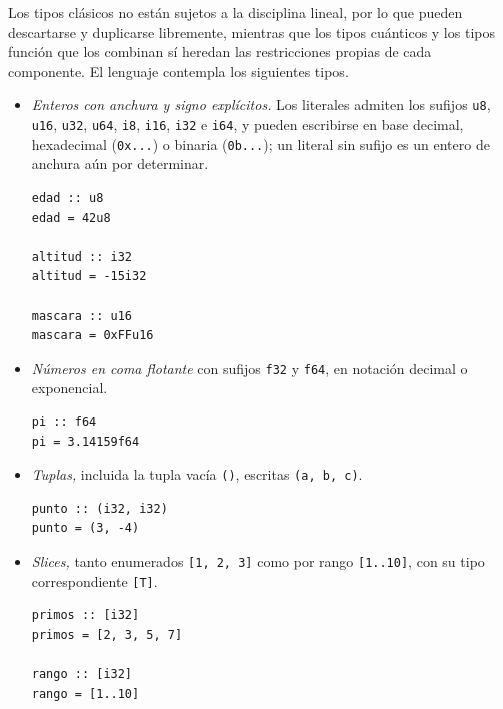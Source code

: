 Los tipos clásicos no están sujetos a la disciplina lineal, por lo que pueden descartarse y duplicarse libremente, mientras que los tipos cuánticos y los tipos función que los combinan sí heredan las restricciones propias de cada componente. El lenguaje contempla los siguientes tipos.

\begin{itemize}
  \item \textit{Enteros con anchura y signo explícitos.} Los literales admiten los sufijos \lstinline|u8|, \lstinline|u16|, \lstinline|u32|, \lstinline|u64|, \lstinline|i8|, \lstinline|i16|, \lstinline|i32| e \lstinline|i64|, y pueden escribirse en base decimal, hexadecimal (\lstinline|0x...|) o binaria (\lstinline|0b...|); un literal sin sufijo es un entero de anchura aún por determinar.

\begin{lstlisting}[language={}, caption=Declaración de constantes enteras con distintos sufijos y bases]
edad :: u8
edad = 42u8

altitud :: i32
altitud = -15i32

mascara :: u16
mascara = 0xFFu16
\end{lstlisting}

  \item \textit{Números en coma flotante} con sufijos \lstinline|f32| y \lstinline|f64|, en notación decimal o exponencial.

\begin{lstlisting}[language={}, caption=Declaración de una constante en coma flotante]
pi :: f64
pi = 3.14159f64
\end{lstlisting}

  \item \textit{Tuplas,} incluida la tupla vacía \lstinline|()|, escritas \lstinline|(a, b, c)|.

\begin{lstlisting}[language={}, caption=Declaración de una tupla de dos componentes]
punto :: (i32, i32)
punto = (3, -4)
\end{lstlisting}

  \item \textit{Slices,} tanto enumerados \lstinline|[1, 2, 3]| como por rango \lstinline|[1..10]|, con su tipo correspondiente \lstinline|[T]|.

\begin{lstlisting}[language={}, caption=Declaración de slices enumerado y por rango]
primos :: [i32]
primos = [2, 3, 5, 7]

rango :: [i32]
rango = [1..10]
\end{lstlisting}


\end{itemize}
